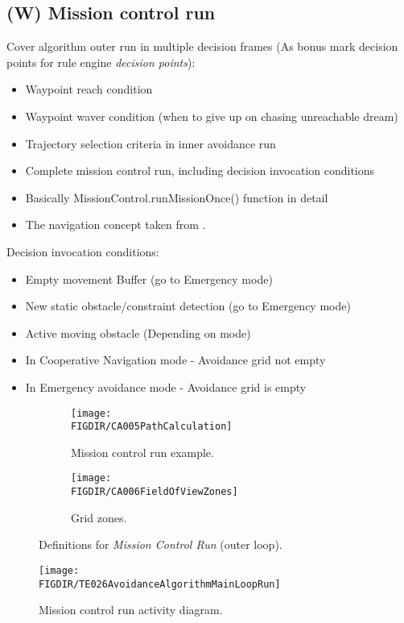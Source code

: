 \subsection{(W) Mission control run}\label{s:missionControlRun}
    \noindent Cover algorithm outer run in multiple decision frames (As bonus mark decision points for rule engine \emph{decision points}):
    \begin{itemize}
        \item Waypoint reach condition
        \item Waypoint waver condition (when to give up on chasing unreachable dream)
        \item Trajectory selection criteria in inner avoidance run
        \item Complete mission control run, including decision invocation conditions
        \item Basically MissionControl.runMissionOnce() function in detail
		\item The navigation concept taken from \cite{sabatini2014navigation,Sabatini2014}.
    \end{itemize}
    \noindent Decision invocation conditions:
    \begin{itemize}
        \item Empty movement Buffer (go to Emergency mode)
        \item New static obstacle/constraint detection (go to Emergency mode)
        \item Active moving obstacle (Depending on mode)
        \item In Cooperative Navigation mode - Avoidance grid not empty
        \item In Emergency avoidance mode - Avoidance grid is empty
    \end{itemize}
    \begin{figure}[H]
	    \centering
        \begin{subfigure}{0.48\textwidth}
            \texttt{[image: \\FIGDIR/CA005PathCalculation]}
            \caption{Mission control run example.}
            \label{fig:missionControlRunExample}
        \end{subfigure}
        \begin{subfigure}{0.48\textwidth}
            \texttt{[image: \\FIGDIR/CA006FieldOfViewZones]} 
            \caption{Grid zones.}
            \label{fig:gridZonesMissionControl}
        \end{subfigure}
        \caption{Definitions for \emph{Mission Control Run} (outer loop).}
        \label{fig:definitionsForMissionControlRun}
    \end{figure}
    
    \begin{figure}[H]
        \centering
        \texttt{[image: \\FIGDIR/TE026AvoidanceAlgorithmMainLoopRun]}
        \caption{Mission control run activity diagram.}
        \label{fig:missionControlRunActivityDiagram}
    \end{figure}

